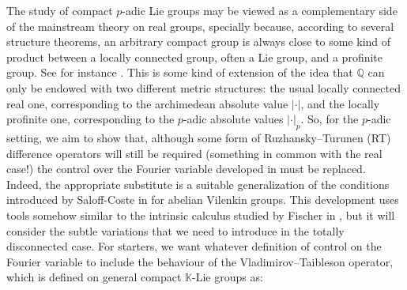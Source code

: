 \documentclass[12pt, reqno]{amsart}
\newcommand{\Q}{\mathbb{Q}}
\newcommand{\1}{\mathds{1}}
\begin{document}
The study of compact \(p\)-adic Lie groups may be viewed as a complementary side of the mainstream theory on real groups, specially because, according to several structure theorems, an arbitrary compact group is always close to some kind of product between a locally connected group, often a Lie group, and a profinite group. See for instance \cite[Chapter 9]{Hofmann2020}. This is some kind of extension of the idea that $\Q$ can only be endowed with two different metric structures: the usual locally connected real one, corresponding to the archimedean absolute value $| \cdot |$, and the locally profinite one, corresponding to the $p$-adic absolute values $| \cdot |_p$. So, for the $p$-adic setting, we aim to show that, although some form of Ruzhansky--Turunen (RT) difference operators \cite{Fischer2015, Fischer2020, Ruzhansky2015} will still be required (something in common with the real case!) the control over the Fourier variable developed in \cite{Ruzhansky2015} must be replaced. Indeed, the appropriate substitute is a suitable generalization of the conditions introduced by Saloff-Coste in \cite{SaloffCoste1986} for abelian Vilenkin groups. This development uses tools somehow similar to the intrinsic calculus studied by Fischer in \cite{Fischer2015, Fischer2020}, but it will consider the subtle variations that we need to introduce in the totally disconnected case. For starters, we want whatever definition of control on the Fourier variable to include the behaviour of the Vladimirov–Taibleson operator, which is defined on general compact $\mathbb{K}$-Lie groups as:
\end{document}

